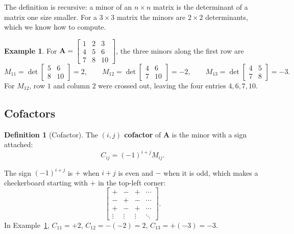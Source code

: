 \documentclass[11pt]{article}
\theoremstyle{plain}
\theoremstyle{definition}
\newtheorem{defn}{Definition}[section]
\newtheorem{ex}{Example}[section]
\theoremstyle{remark}
\newcommand{\mt}[1]{\mathbf{#1}}
\begin{document}
\noindent The definition is recursive: a minor of an $n\times n$ matrix is the
determinant of a matrix one size smaller. For a $3\times3$ matrix the minors are
$2\times2$ determinants, which we know how to compute.

\begin{ex}
\label{ex:minors}
For
$\mt{A}=\begin{bmatrix}1&2&3\\4&5&6\\7&8&10\end{bmatrix}$, the three minors along
the first row are
\[
  M_{11}=\det\begin{bmatrix}5&6\\8&10\end{bmatrix}=2,\qquad
  M_{12}=\det\begin{bmatrix}4&6\\7&10\end{bmatrix}=-2,\qquad
  M_{13}=\det\begin{bmatrix}4&5\\7&8\end{bmatrix}=-3 .
\]
For $M_{12}$, row $1$ and column $2$ were crossed out, leaving the four entries
$4,6,7,10$.
\end{ex}

\subsection{Cofactors}
\begin{defn}[Cofactor]
The \textbf{$(i,j)$ cofactor} of $\mt{A}$ is the minor with a sign attached:
\[
  C_{ij}=(-1)^{i+j}M_{ij}.
\]
\end{defn}

\noindent The sign $(-1)^{i+j}$ is $+$ when $i+j$ is even and $-$ when it is
odd, which makes a checkerboard starting with $+$ in the top-left corner:
\[
  \begin{bmatrix}+&-&+&\cdots\\-&+&-&\cdots\\+&-&+&\cdots\\\vdots&\vdots&\vdots&\ddots\end{bmatrix}.
\]
In Example~\ref{ex:minors}, $C_{11}=+2$, $C_{12}=-(-2)=2$, $C_{13}=+(-3)=-3$.

\end{document}
